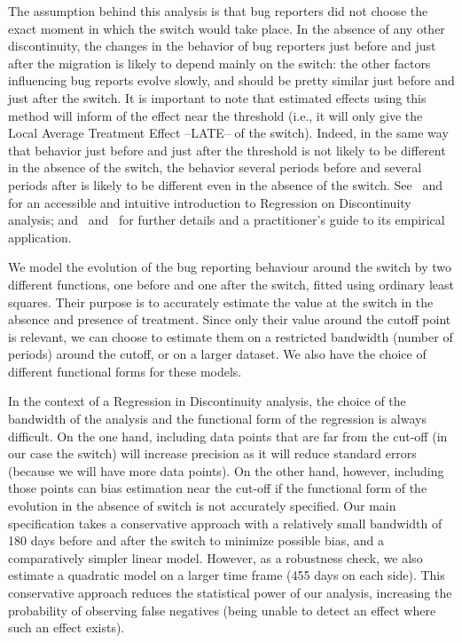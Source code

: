 \documentclass[conference]{IEEEtran}
\begin{document}
The assumption behind this analysis is that bug reporters did not choose the exact moment in which the switch would take place. In the absence of any other discontinuity, the changes in the behavior of bug reporters just before and just after the migration is likely to depend mainly on the switch: the other factors influencing bug reports evolve slowly, and should be pretty similar just before and just after the switch. It is important to note that estimated effects using this method will inform of the effect near the threshold (i.e., it will only give the Local Average Treatment Effect --LATE-- of the switch). Indeed, in the same way that behavior just before and just after the threshold is not likely to be different in the absence of the switch, the behavior several periods before and several periods after is likely to be different even in the absence of the switch. See~\cite{angrist2014mastering} and~\cite{angrist2008mostly} for an accessible and intuitive introduction to Regression on Discontinuity analysis; and~\cite{lee2010regression} and~\cite{jacob2012practical} for further details and a practitioner's guide to its empirical application.

We model the evolution of the bug reporting behaviour around the switch by two different functions, one before and one after the switch, fitted using ordinary least squares. Their purpose is to accurately estimate the value at the switch in the absence and presence of treatment. Since only their value around the cutoff point is relevant, we can choose to estimate them on a restricted bandwidth (number of periods) around the cutoff, or on a larger dataset. We also have the choice of different functional forms for these models.

In the context of a Regression in Discontinuity analysis, the choice of the bandwidth of the analysis and the functional form of the regression is always difficult. On the one hand, including data points that are far from the cut-off (in our case the switch) will increase precision as it will reduce standard errors (because we will have more data points). On the other hand, however, including those points can bias estimation near the cut-off if the functional form of the evolution in the absence of switch is not accurately specified. Our main specification takes a conservative approach with a relatively small bandwidth of 180 days before and after the switch to minimize possible bias, and a comparatively simpler linear model. However, as a robustness check, we also estimate a quadratic model on a larger time frame (455 days on each side). This conservative approach reduces the statistical power of our analysis, increasing the probability of observing false negatives (being unable to detect an effect where such an effect exists).
\end{document}
